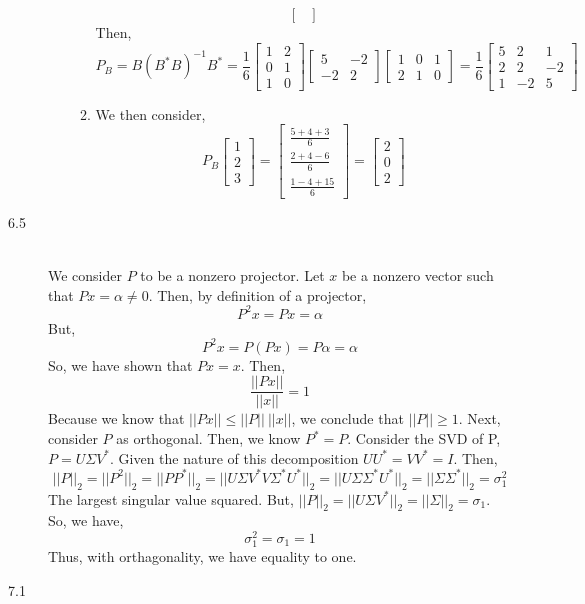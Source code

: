 \documentclass[letterpaper,10pt]{article}
\begin{document}
\begin{description}
\begin{enumerate}
\begin{enumerate}
\[\begin{bmatrix}
\end{bmatrix} \]
Then,
\[P_B=B(B^*B)^{-1}B^*=\frac{1}{6}\begin{bmatrix}
1 & 2\\0 & 1\\1 & 0
\end{bmatrix}\begin{bmatrix}
5 & -2\\-2 & 2
\end{bmatrix}\begin{bmatrix}
1 & 0 & 1\\2 & 1 & 0
\end{bmatrix}=\frac{1}{6}\begin{bmatrix}
5 & 2 & 1\\ 2 & 2 & -2\\ 1 & -2 & 5
\end{bmatrix} \]
\item We then consider,
\[P_B\begin{bmatrix}
1\\2\\3
\end{bmatrix}=\begin{bmatrix}
\frac{5+4+3}{6}\\\frac{2+4-6}{6}\\\frac{1-4+15}{6}
\end{bmatrix}=\begin{bmatrix}
2\\0\\2
\end{bmatrix} \]
\end{enumerate}
\end{enumerate}
\item[6.5]\hfill \\
We consider $P$ to be a nonzero projector. Let $x$ be a nonzero vector such that $Px=\alpha\neq 0$. Then, by definition of a projector,
\[P^2x=Px=\alpha\]
But,
\[P^2x=P(Px)=P\alpha=\alpha\]
So, we have shown that $Px=x$. Then, 
\[\frac{||Px||}{||x||}=1\]
Because we know that $||Px||\leq ||P||\ ||x||$, we conclude that $||P||\geq 1$. Next, consider $P$ as orthogonal. Then, we know $P^*=P$. Consider the SVD of P, $P=U\Sigma V^*$. Given the nature of this decomposition $UU^*=VV^*=I$. Then,
\[||P||_2=||P^2||_2=||PP^*||_2=||U\Sigma V^*V\Sigma^* U^*||_2=||U\Sigma \Sigma^* U^*||_2=||\Sigma \Sigma^*||_2=\sigma_1^2\]
The largest singular value squared. But, $||P||_2=||U\Sigma V^*||_2=||\Sigma||_2=\sigma_1$. So, we have,
\[\sigma_1^2=\sigma_1=1\]
Thus, with orthagonality, we have equality to one.
\item[7.1]\hfill \\

\end{description}
\end{document}
